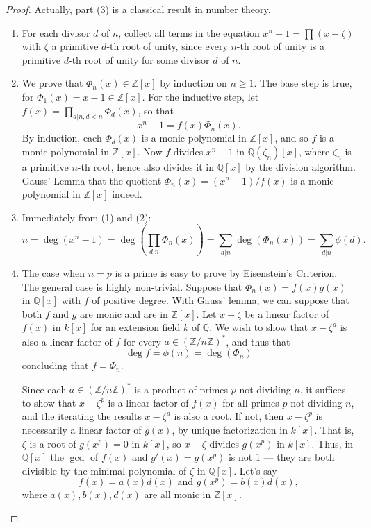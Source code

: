 \documentclass[12pt]{report}
\theoremstyle{definition}
\newcommand{\ZZ}{\mathbb{Z}}
\newcommand{\QQ}{\mathbb{Q}}
\begin{document}
\begin{proof}
	Actually, part (3) is a classical result in number theory.
	\begin{enumerate}
		\item For each divisor $d$ of $n$, collect all terms in the equation $x^n- 1 = \prod(x- \zeta)$ with $\zeta$ a primitive $d$-th root of unity, since every $n$-th root of unity is a primitive $d$-th root of unity for some divisor $d$ of $n$.
		\item We prove that $\Phi_n(x) \in  \ZZ[x]$ by induction on $n \geq  1$. The base step is true, for $\Phi_1(x) = x- 1 \in  \ZZ[x]$. For the inductive step, let $f(x) =\prod_{d|n,d<n} \Phi_d(x)$, so that $$x^n - 1 = f(x)\Phi_n(x).$$
		      By induction, each $\Phi_d(x)$ is a monic polynomial in $\ZZ[x]$, and so $f$ is a monic polynomial in $\ZZ[x]$. Now $f$ divides $x^n-1$ in $\QQ(\zeta_n)[x]$, where $\zeta_n$ is a primitive $n$-th root, hence also divides it in $\QQ[x]$ by the division algorithm. Gauss' Lemma that the quotient $\Phi_n(x)=(x^n- 1)/f(x)$ is a monic polynomial in $\ZZ[x]$ indeed.
		\item Immediately from (1) and (2):
		      $$n=\deg(x^n-1)=\deg(\prod_{d|n}\Phi_n(x))=\sum_{d|n}\deg(\Phi_n(x))=\sum_{d|n} \phi(d).$$
		\item The case when $n=p$ is a prime is easy to prove by Eisenstein's Criterion. The general case is highly non-trivial.
		      Suppose that $\Phi_n(x) = f(x)g(x)$ in $\QQ[x]$ with $f$ of positive degree. With Gauss' lemma, we can suppose that both $f$ and $g$ are monic and are in $\ZZ[x]$. Let $x - \zeta$ be a linear factor of $f(x)$ in $k[x]$ for an extension field $k$ of $\QQ$. We wish to show that $x - \zeta^a$ is also a linear factor of $f$ for every $a \in (\ZZ/n\ZZ)^*$, and thus that $$ \deg f = \phi(n) = \deg (\Phi_n)$$ concluding that $f = \Phi_n$.

		      Since each $a \in (\ZZ/n\ZZ)^*$ is a product of primes $p$ not dividing $n$, it suffices to show that $x - \zeta^p$ is a linear factor of $f(x)$ for all primes $p$ not dividing $n$, and the iterating the results $x-\zeta^a$ is also a root. If not, then $x - \zeta^p$ is necessarily a linear factor of $g(x)$, by unique factorization in $k[x]$. That is, $\zeta$ is a root of $g(x^p) = 0$ in $k[x]$, so $x - \zeta$ divides $g(x^p)$ in $k[x]$.
		      Thus, in $\QQ[x]$ the $\gcd$ of $f(x)$ and $g'(x)=g(x^p)$ is not 1 --- they are both divisible by the minimal polynomial of $\zeta$ in $\QQ[x]$. Let's say
		      $$f(x)=a(x)d(x) \mbox{ and } g(x^p)=b(x)d(x),$$ where $a(x),b(x),d(x)$ are all monic in $\ZZ[x]$.


\end{enumerate}
\end{proof}
\end{document}
